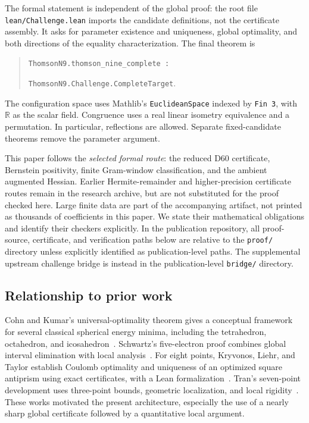 \documentclass[11pt]{article}
\theoremstyle{remark}
\newcommand{\R}{\mathbb R}
\newcommand{\code}[1]{{\small\nolinkurl{#1}}}
\newcommand{\pathcode}[1]{\nolinkurl{#1}}
\begin{document}
The formal statement is independent of the global proof: the root file
\pathcode{lean/Challenge.lean} imports the candidate definitions, not the
certificate assembly. It asks for parameter existence and uniqueness, global
optimality, and both directions of the equality characterization. The final
theorem is
\begin{quote}
\code{ThomsonN9.thomson_nine_complete :}\par
\code{ThomsonN9.Challenge.CompleteTarget}.
\end{quote}
The configuration space uses Mathlib's \code{EuclideanSpace} indexed by
\code{Fin 3}, with $\R$ as the scalar field. Congruence uses a real
linear isometry equivalence and a permutation. In particular, reflections
are allowed. Separate fixed-candidate theorems remove the parameter argument.

This paper follows the \emph{selected formal route}: the reduced D60
certificate, Bernstein positivity, finite Gram-window classification, and the
ambient augmented Hessian. Earlier Hermite-remainder and higher-precision
certificate routes remain in the research archive, but are not substituted
for the proof checked here. Large finite data are part of the accompanying
artifact, not printed as thousands of coefficients in this paper. We state
their mathematical obligations and identify their checkers explicitly.
In the publication repository, all proof-source, certificate, and verification
paths below are relative to the \pathcode{proof/} directory unless explicitly
identified as publication-level paths. The supplemental upstream challenge
bridge is instead in the publication-level \pathcode{bridge/} directory.

\subsection{Relationship to prior work}
Cohn and Kumar's universal-optimality theorem gives a conceptual framework for
several classical spherical energy minima, including the tetrahedron,
octahedron, and icosahedron~\cite{cohnkumar}. Schwartz's five-electron proof
combines global interval elimination with local analysis~\cite{schwartz}.
For eight points, Kryvonos, Liehr, and Taylor establish Coulomb optimality and
uniqueness of an optimized square antiprism using exact certificates, with a
Lean formalization~\cite{klt,n8code}. Tran's seven-point development uses
three-point bounds, geometric localization, and local rigidity~\cite{tran}.
These works motivated the present architecture, especially the use of a
nearly sharp global certificate followed by a quantitative local argument.
\end{document}
